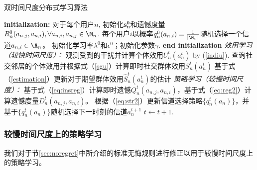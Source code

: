 \begin{algorithm}
\caption{双时间尺度分布式学习算法}
\label{alg:RCS}
\begin{algorithmic}[1]
\STATE \textbf{initialization:} 对于每个用户$n$,
\STATE 初始化$\mathbf{s^0_n}$和遗憾度量$R_n^0(a_{n,j},a_{n,i}), \forall a_{n,i}, a_{n,j}\in\M_n$.
\STATE 每个用户$i$以概率$q^0_n(a_{n,i})=\frac{1}{|\M_n|}$随机选择一个信道$a_{n,i}\in\A_n$。
\STATE 初始化学习率$\lambda^0$和$\epsilon^0$；初始化参数$\gamma$.
\STATE \textbf{end initialization}
\STATE \emph{效用学习（较快时间尺度）：}
\STATE 观测受到的干扰并计算个体效用$U_n^t(a^t_n)$ by (\ref{indiu}).
\STATE 查询社交邻居的个体效用并根据式（\ref{sgu}）计算即时社交群体效用$S_{n}^t(a^t_n)$
\STATE 基于式（\ref{estimation}）更新对于期望群体效用$\hat{S}_{n}^t(a^t_n)$的估计
\STATE \emph{策略学习（较慢时间尺度）：}
\STATE 基于式（\ref{eq:insreg}）计算即时遗憾$Q^t_n(a_{n,j},a_{n,i})$，基于式（\ref{eq:reg2}）计算遗憾度量$D^t_n(a_{n,j},a_{n,i})$。
\STATE 根据（\ref{eq:str2}）更新信道选择策略$\{q^t_n(a_n)\}$，并基于$\{q^t_n(a_n)\}$随机选择下一时刻的信道$a^{t+1}_n$
\STATE $t\leftarrow t+1$.
\ENDFOR
\end{algorithmic}
\end{algorithm}

\subsubsection{较慢时间尺度上的策略学习}\label{sec:single}
我们对于节\ref{sec:noregret}中所介绍的标准无悔规则进行修正以用于较慢时间尺度上的策略学习。

